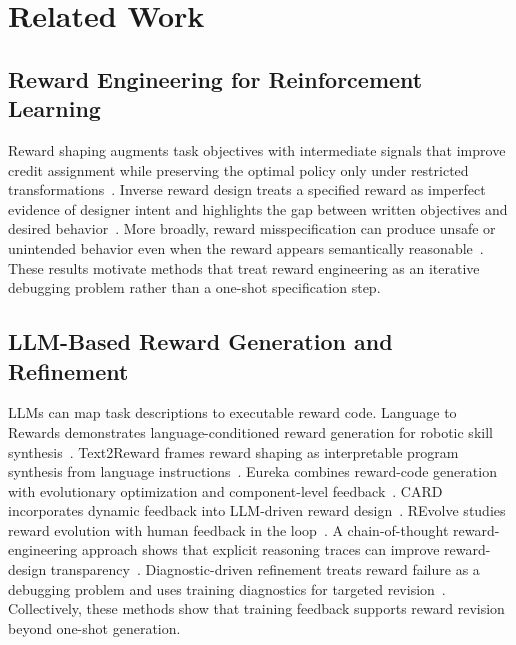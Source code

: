 \section{Related Work}
\subsection{Reward Engineering for Reinforcement Learning}
Reward shaping augments task objectives with intermediate signals that improve credit assignment while preserving the optimal policy only under restricted transformations~\cite{ng1999policy}. Inverse reward design treats a specified reward as imperfect evidence of designer intent and highlights the gap between written objectives and desired behavior~\cite{hadfield2017inverse}. More broadly, reward misspecification can produce unsafe or unintended behavior even when the reward appears semantically reasonable~\cite{amodei2016concrete}. These results motivate methods that treat reward engineering as an iterative debugging problem rather than a one-shot specification step.

\subsection{LLM-Based Reward Generation and Refinement}
LLMs can map task descriptions to executable reward code. Language to Rewards demonstrates language-conditioned reward generation for robotic skill synthesis~\cite{language2rewards}. Text2Reward frames reward shaping as interpretable program synthesis from language instructions~\cite{text2reward}. Eureka combines reward-code generation with evolutionary optimization and component-level feedback~\cite{eureka}. CARD incorporates dynamic feedback into LLM-driven reward design~\cite{card}. REvolve studies reward evolution with human feedback in the loop~\cite{revolve}. A chain-of-thought reward-engineering approach shows that explicit reasoning traces can improve reward-design transparency~\cite{cotreward}. Diagnostic-driven refinement treats reward failure as a debugging problem and uses training diagnostics for targeted revision~\cite{wang2026diagnostic}. Collectively, these methods show that training feedback supports reward revision beyond one-shot generation.

